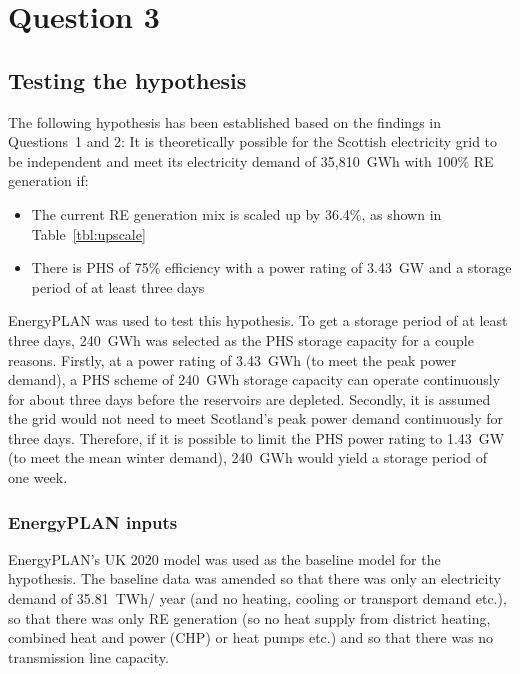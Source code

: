 \section{Question 3}



\subsection{Testing the hypothesis}

The following hypothesis has been established based on the findings in Questions~1 and 2:
It is theoretically possible for the Scottish electricity grid to be independent and meet its electricity demand of 35,810~GWh with 100\% RE generation if:
\begin{itemize}
	\item The current RE generation mix is scaled up by 36.4\%, as shown in Table~\ref{tbl:upscale}
	\item There is PHS of 75\% efficiency with a power rating of 3.43~GW and a storage period of at least three days
\end{itemize}

EnergyPLAN was used to test this hypothesis.
To get a storage period of at least three days, 240~GWh was selected as the PHS storage capacity for a couple reasons.
Firstly, at a power rating of 3.43~GWh (to meet the peak power demand), a PHS scheme of 240~GWh storage capacity can operate continuously for about three days before the reservoirs are depleted.
Secondly, it is assumed the grid would not need to meet Scotland's peak power demand continuously for three days.
Therefore, if it is possible to limit the PHS power rating to 1.43~GW (to meet the mean winter demand), 240~GWh would yield a storage period of one week.



\subsubsection{EnergyPLAN inputs}

EnergyPLAN's UK 2020 model \citep{EnergyPLAN_UK2020} was used as the baseline model for the hypothesis.
The baseline data was amended so that there was only an electricity demand of 35.81~TWh/ year (and no heating, cooling or transport demand etc.), so that there was only RE generation (so no heat supply from district heating, combined heat and power (CHP) or heat pumps etc.) and so that there was no transmission line capacity.

